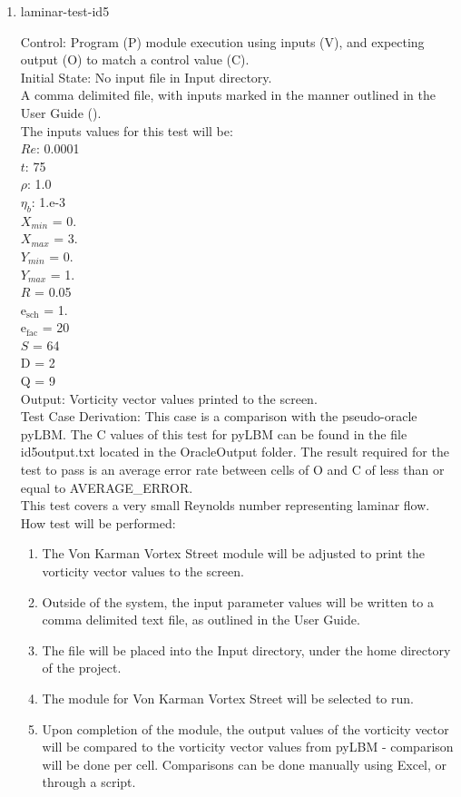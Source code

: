 \documentclass[12pt, titlepage]{article}
\begin{document}
\begin{enumerate}
\item{laminar-test-id5\\}

Control: Program (P) module execution using inputs (V), and expecting output (O) to match a control value (C).\\
					
Initial State: No input file in Input directory.\\
					
A comma delimited file, with inputs marked in the manner outlined in the User Guide (\citet{LBM_UserGuide_PM}).\\The inputs values for this test will be:\\
$Re$: 0.0001\\
$t$: 75\\
$\rho$: 1.0\\
$\eta_b$: 1.e-3\\
$X_{min}$ = 0.\\
$X_{max}$ = 3.\\
$Y_{min}$ = 0.\\
$Y_{max}$ = 1.\\
$R$ = 0.05\\
$\mathrm{e_{sch}}$ = 1.\\
$\mathrm{e_{fac}}$ = 20\\
$S$ = 64\\
$\mathrm{D}$ = 2\\
$\mathrm{Q}$ = 9\\
					
Output: Vorticity vector values printed to the screen.\\

Test Case Derivation: This case is a comparison with the pseudo-oracle pyLBM. The C values of this test for pyLBM can be found in the file id5output.txt located in the OracleOutput folder. The result required for the test to pass is an average error rate between cells of O and C of less than or equal to AVERAGE\_ERROR.\\
This test covers a very small Reynolds number representing laminar flow.\\	

					
How test will be performed: 

\begin{enumerate}
\item The Von Karman Vortex Street module will be adjusted to print the vorticity vector values to the screen.
\item Outside of the system, the input parameter values will be written to a comma delimited text file, as outlined in the User Guide.
\item The file will be placed into the Input directory, under the home directory of the project.
\item The module for Von Karman Vortex Street will be selected to run.
\item Upon completion of the module, the output values of the vorticity vector will be compared to the vorticity vector values from pyLBM - comparison will be done per cell. Comparisons can be done manually using Excel, or through a script.\\
\end{enumerate}


\end{enumerate}
\end{document}

